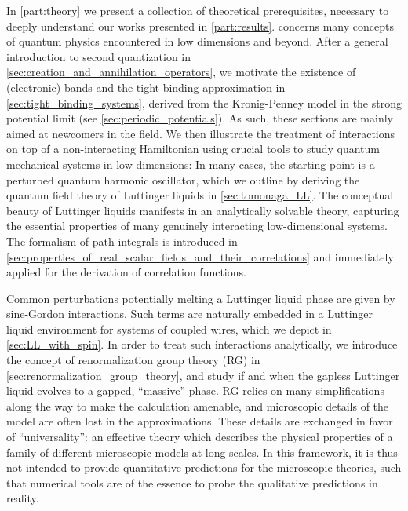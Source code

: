 In \cref{part:theory} we present a collection of theoretical prerequisites, necessary to deeply understand our works presented in \cref{part:results}.
 concerns many concepts of quantum physics encountered in low dimensions and beyond.
After a general introduction to second quantization in \cref{sec:creation_and_annihilation_operators}, we motivate the existence of (electronic) bands and the tight binding approximation in \cref{sec:tight_binding_systems}, derived from the Kronig-Penney model in the strong potential limit (see \cref{sec:periodic_potentials}).
As such, these sections are mainly aimed at newcomers in the field.
We then illustrate the treatment of interactions on top of a non-interacting Hamiltonian using crucial tools to study quantum mechanical systems in low dimensions: In many cases, the starting point is a perturbed quantum harmonic oscillator, which we outline by deriving the quantum field theory of Luttinger liquids in \cref{sec:tomonaga_LL}.
The conceptual beauty of Luttinger liquids manifests in an analytically solvable theory, capturing the essential properties of many genuinely interacting low-dimensional systems.
The formalism of path integrals is introduced in \cref{sec:properties_of_real_scalar_fields_and_their_correlations} and immediately applied for the derivation of correlation functions.

Common perturbations potentially melting a Luttinger liquid phase are given by sine-Gordon interactions.
Such terms are naturally embedded in a Luttinger liquid environment for systems of coupled wires, which we depict in \cref{sec:LL_with_spin}.
In order to treat such interactions analytically, we introduce the concept of renormalization group theory (RG) in \cref{sec:renormalization_group_theory}, and study if and when the gapless Luttinger liquid evolves to a gapped, ``massive'' phase.
RG relies on many simplifications along the way to make the calculation amenable, and microscopic details of the model are often lost in the approximations.
These details are exchanged in favor of ``universality'': an effective theory which describes the physical properties of a family of different microscopic models at long scales.
In this framework, it is thus not intended to provide quantitative predictions for the microscopic theories, such that numerical tools are of the essence to probe the qualitative predictions in reality.


